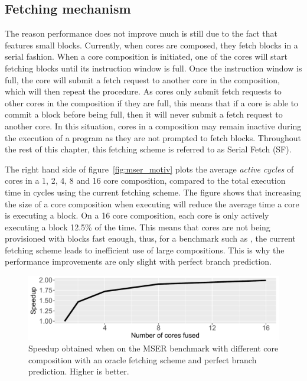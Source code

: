 \subsection{Fetching mechanism}

The reason performance does not improve much is still due to the fact that  features small blocks.
Currently, when cores are composed, they fetch blocks in a serial fashion.
When a core composition is initiated, one of the cores will start fetching blocks until its instruction window is full.
Once the instruction window is full, the core will submit a fetch request to another core in the composition, which will then repeat the procedure.
As cores only submit fetch requests to other cores in the composition if they are full, this means that if a core is able to commit a block before being full, then it will never submit a fetch request to another core.
In this situation, cores in a composition may remain inactive during the execution of a program as they are not prompted to fetch blocks.
Throughout the rest of this chapter, this fetching scheme is referred to as Serial Fetch (SF).%

The right hand side of figure~\ref{fig:mser_motiv} plots the average \textit{active cycles} of cores in a 1, 2, 4, 8 and 16 core composition, compared to the total execution time in cycles using the current fetching scheme.
The figure shows that increasing the size of a core composition when executing  will reduce the average time a core is executing a block.
On a 16 core composition, each core is only actively executing a block 12.5\% of the time.
This means that cores are not being provisioned with blocks fast enough, thus, for a benchmark such as , the current fetching scheme leads to inefficient use of large compositions.
This is why the performance improvements are only slight with perfect branch prediction.


\begin{figure}[t]
    \centering
    \includegraphics[width=1\textwidth]{chapter3/graphics/perfect_fetch_motiv.pdf}
    \caption{Speedup obtained when on the MSER benchmark with different core composition with an oracle fetching scheme and perfect branch prediction. Higher is better. }
    \label{fig:motivation_fetch}
	\vspace{1em}
\end{figure}

